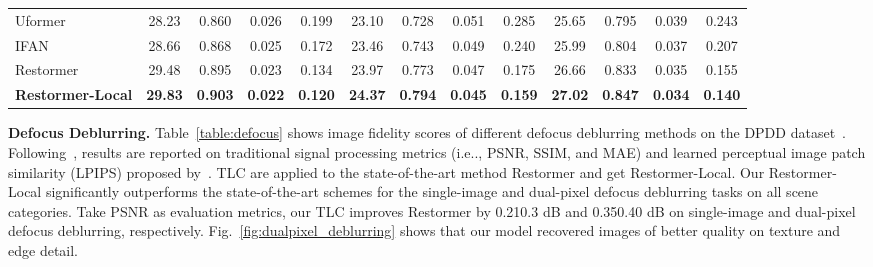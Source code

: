 \documentclass[runningheads]{llncs}
\makeatletter
\DeclareRobustCommand\onedot{\futurelet\@let@token\@onedot}
\def\@onedot{\ifx\@let@token.\else.\null\fi\xspace}
\def\ie{i.e\onedot}
\makeatother
\begin{document}
\begin{table*}[!t]
{\begin{tabular}{l | c c c c | c c c c | c c c c }
Uformer~\cite{wang2021uformer} & 28.23 & 0.860 & 0.026 & 0.199 & 23.10 & 0.728 & 0.051 & 0.285 & 25.65 & 0.795 & 0.039 & 0.243 \\
IFAN~\cite{lee2021iterative} & 28.66& 0.868& 0.025& 0.172& 23.46& 0.743& 0.049& 0.240& 25.99& 0.804& 0.037& 0.207\\ \hline
Restormer~\cite{zamir2021restormer}&   29.48  &   0.895 &   0.023&   0.134&   23.97 &   0.773 &   0.047&   0.175 &   26.66 &   0.833 &   0.035 &   0.155\\
\textbf{Restormer-Local}&   \textbf{29.83}&\textbf{0.903}&\textbf{0.022}&\textbf{0.120}&\textbf{24.37}&\textbf{0.794}&\textbf{0.045}&\textbf{0.159}&\textbf{27.02}&\textbf{0.847}&\textbf{0.034}&\textbf{0.140}  \\
\bottomrule
\end{tabular}}
\end{table*}


 \textbf{Defocus Deblurring.} Table~\ref{table:defocus} shows image fidelity scores of different defocus deblurring methods on the DPDD dataset~\cite{abuolaim2020defocus}.
Following~\cite{abuolaim2020defocus}, results are reported on traditional signal processing metrics (\ie, PSNR, SSIM, and MAE) and learned perceptual image patch similarity (LPIPS) proposed by~\cite{zhang2018unreasonable}.
TLC are applied to the state-of-the-art method Restormer and get Restormer-Local.
Our Restormer-Local significantly outperforms the state-of-the-art schemes for the single-image and dual-pixel defocus deblurring tasks on all scene categories.
Take PSNR as evaluation metrics, our TLC improves Restormer by 0.210.3 dB and 0.350.40 dB on single-image and dual-pixel defocus deblurring, respectively. 
Fig.~\ref{fig:dualpixel_deblurring} shows that our model recovered images of better quality on texture and edge detail.
\begin{figure*}[!t]
\centering
{}
\caption{Qualitative evaluation of our TLC for {Dual-pixel defocus deblurring} on the DPDD dataset~\cite{abuolaim2020defocus}. Restormer with our TLC (\ie, Restormer-Local) more effectively removes blur while preserving the fine image details.}
\label{fig:dualpixel_deblurring}
\end{figure*}
\end{document}
